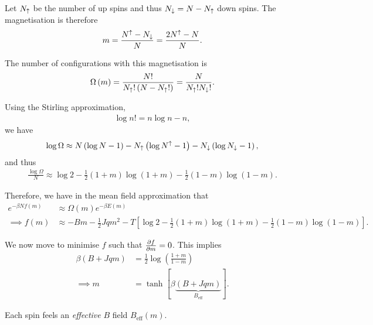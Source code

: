 
Let $N_{\uparrow}$ be the number of up spins and thus $N_{\downarrow} = N - N_{\uparrow}$ down spins. The magnetisation is therefore
\begin{align}
    m = \frac{N^{\uparrow} - N_\downarrow}{N} = \frac{2N^{\uparrow} - N}{N}
.\end{align}

The number of configurations with this magnetisation is
\begin{align}
    \Omega \left( m \right) = \frac{N!}{N_\uparrow ! \left( N - N_{\uparrow}! \right)} = \frac{N}{N_{\uparrow}! N_\downarrow !}
.\end{align}

Using the Stirling approximation,
\begin{align}
    \log n! = n \log n - n
,\end{align}
we have
\begin{align}
    \log \Omega \approx N \left( \log N - 1 \right)  - N_\uparrow \left( \log N^{\uparrow} - 1 \right) - N_{\downarrow} \left( \log N_\downarrow - 1 \right) 
,\end{align}
and thus
\begin{align}
    \frac{\log \Omega}{N} \approx \log 2 - \frac{1}{2} \left( 1 + m \right) \log \left( 1 + m \right) - \frac{1}{2} \left( 1 - m \right) \log \left( 1 - m \right) 
.\end{align}

Therefore, we have in the mean field approximation that
\begin{align}
    e^{-\beta N f\left( m \right) } &\approx \Omega \left( m \right) e^{-\beta E \left( m \right) } \\
    \implies f\left( m \right) &\approx - Bm - \frac{1}{2} J q m^2 - T \left[ \log 2 - \frac{1}{2} \left( 1 + m \right)  \log \left( 1 + m \right) - \frac{1}{2} \left( 1 - m \right) \log \left( 1 - m \right)  \right] 
.\end{align}

We now move to minimise $f$ such that $\pdv{f}{m} = 0$. This implies
\begin{align}
    \beta \left( B + J q m \right) &= \frac{1}{2} \log \left( \frac{1 + m}{1 - m} \right)  \\
    \implies m &= \tanh \left[ \beta \underbrace{\left( B + Jqm \right)}_{B_\text{eff}}  \right] 
.\end{align}

Each spin feels an \textit{effective} $B$ field $B_\text{eff}\left( m \right) $.

